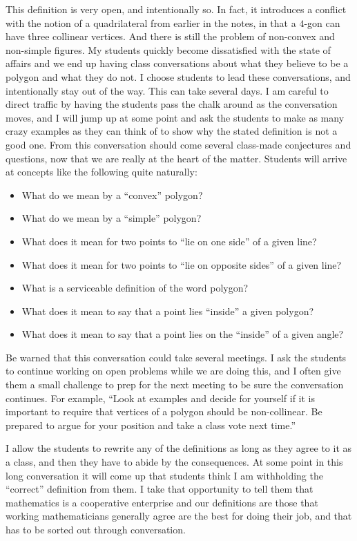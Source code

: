 \begin{annotation}
{
\color{blue}
This definition is very open, and intentionally so. In fact, it introduces a conflict with the notion of a quadrilateral from earlier in the notes, in that a $4$-gon can have three collinear vertices. And there is still the problem of non-convex and non-simple figures. My students quickly become dissatisfied with the state of affairs and we end up having class conversations about what they believe to be a polygon and what they do not. I choose students to lead these conversations, and intentionally stay out of the way. This can take several days. I am careful to direct traffic by having the students pass the chalk around as the conversation moves, and I will jump up at some point and ask the students to make as many crazy examples as they can think of to show why the stated definition is not a good one. From this conversation should come several class-made conjectures and questions, now that we are really at the heart of the matter. Students will arrive at concepts like the following quite naturally:\begin{itemize}
\item What do we mean by a ``convex'' polygon?
\item What do we mean by a ``simple'' polygon?
\item What does it mean for two points to ``lie on one side'' of a
given line?
\item What does it mean for two points to ``lie on opposite sides'' of a given line?
\item What is a serviceable definition of the word polygon?
\item What does it mean to say that a point lies ``inside'' a given polygon?
\item What does it mean to say that a point lies on the ``inside'' of a given angle?
\end{itemize}
Be warned that this conversation could take several meetings. I ask the students to continue working on open problems while we are doing this, and I often give them a small challenge to prep for the next meeting to be sure the conversation continues. For example, ``Look at examples and decide for yourself if it is important to require that vertices of a polygon should be non-collinear. Be prepared to argue for your position and take a class vote next time.''

I allow the students to rewrite any of the definitions as long as they agree to it as a class, and then they have to abide by the consequences. At some point in this long conversation it will come up that students think I am withholding the ``correct'' definition from them. I take that opportunity to tell them that mathematics is a cooperative enterprise and our definitions are those that working mathematicians generally agree are the best for doing their job, and that has to be sorted out through conversation. 
}
\end{annotation}

